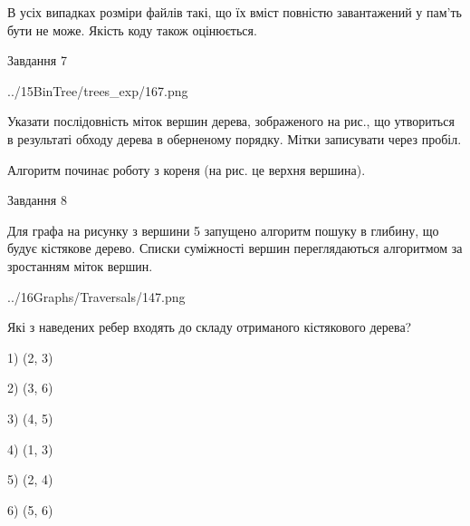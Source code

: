 \documentclass[12pt, ukrainian]{article}
\begin{document}
{В усіх випадках розміри файлів такі, що їх вміст повністю завантажений у пам'ть бути не може. Якість коду також оцінюється.



\vspace{10mm}\par

\newpage
\begin{minipage}[t]{9.7cm}
               
{\begin{center}Завдання {7}\end{center}}
\vspace{-4mm}

\begin{center}
	{../15BinTree/trees_exp/167.png}
\end{center}
Указати послідовність міток вершин дерева, зображеного на рис., що утвориться в результаті обходу дерева в оберненому порядку. Мітки записувати через пробіл.\par Алгоритм починає роботу з кореня (на рис. це верхня вершина).\par

\end{minipage}
\vline \hspace{8mm}
\begin{minipage}[t]{8.0cm}
               
{\begin{center}Завдання {8}\end{center}}
\vspace{-4mm}
Для графа на рисунку з вершини 5 запущено алгоритм пошуку в глибину, що будує кістякове дерево. Списки суміжності вершин переглядаються алгоритмом за зростанням міток вершин.\par
\begin{center}
	{../16Graphs/Traversals/147.png}
\end{center}
\par Які з наведених ребер входять до складу отриманого кістякового дерева?\par
1) (2, 3)\par
2) (3, 6)\par
3) (4, 5)\par
4) (1, 3)\par
5) (2, 4)\par
6) (5, 6)\par
{\vskip 15pt} \par


\end{minipage}}
\end{document}
